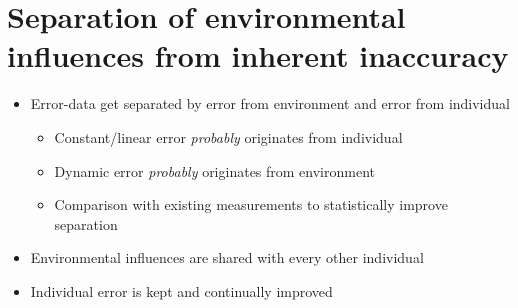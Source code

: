 \section{Separation of environmental influences from inherent inaccuracy}
\begin{itemize}
	\item{Error-data get separated by error from environment and error from individual}
	\begin{itemize}
		\item{Constant/linear error \emph{probably} originates from individual}
		\item{Dynamic error \emph{probably} originates from environment}
		\item{Comparison with existing measurements to statistically improve separation}
	\end{itemize}
	\item{Environmental influences are shared with every other individual}
	\item{Individual error is kept and continually improved}
\end{itemize}